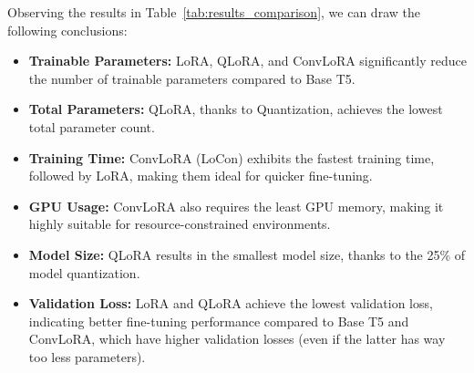 Observing the results in Table~\ref{tab:results_comparison}, we can draw the following conclusions:
\begin{itemize}
    \item \textbf{Trainable Parameters:} LoRA, QLoRA, and ConvLoRA significantly reduce the number of trainable parameters compared to Base T5.
    \item \textbf{Total Parameters:} QLoRA, thanks to Quantization, achieves the lowest total parameter count.
    \item \textbf{Training Time:} ConvLoRA (LoCon) exhibits the fastest training time, followed by LoRA, making them ideal for quicker fine-tuning.
    \item \textbf{GPU Usage:} ConvLoRA also requires the least GPU memory, making it highly suitable for resource-constrained environments.
    \item \textbf{Model Size:} QLoRA results in the smallest model size, thanks to the 25\% of model quantization.
    \item \textbf{Validation Loss:} LoRA and QLoRA achieve the lowest validation loss, indicating better fine-tuning performance compared to Base T5 and ConvLoRA, which have higher validation losses (even if the latter has way too less parameters).
\end{itemize}

